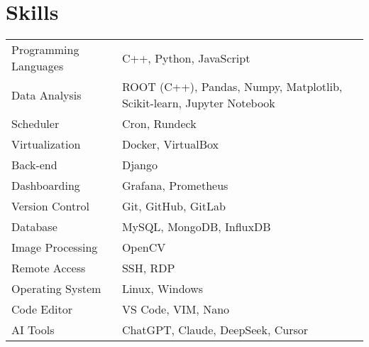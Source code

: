 \documentclass[a4paper,12pt]{article}
\begin{document}
\section{Skills}
\begin{tabularx}{\linewidth}{@{}l X@{}}
Programming Languages &  \normalsize{C++, Python, JavaScript}\\
Data Analysis & \normalsize{ROOT (C++), Pandas, Numpy, Matplotlib, Scikit-learn, Jupyter Notebook}\\
Scheduler & \normalsize{Cron, Rundeck}\\
Virtualization & \normalsize{Docker, VirtualBox}\\
Back-end & \normalsize{Django}\\
Dashboarding & \normalsize{Grafana, Prometheus}\\
Version Control & \normalsize{Git, GitHub, GitLab}\\
Database & \normalsize{MySQL, MongoDB, InfluxDB}\\
Image Processing & \normalsize{OpenCV}\\
Remote Access & \normalsize{SSH, RDP}\\
Operating System & \normalsize{Linux, Windows}\\
Code Editor & \normalsize{VS Code, VIM, Nano}\\
AI Tools & \normalsize{ChatGPT, Claude, DeepSeek, Cursor}\\
\end{tabularx}

\end{document}
